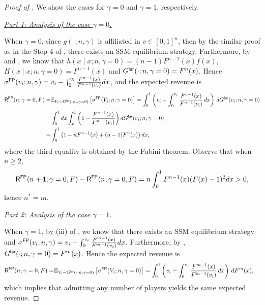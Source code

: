 \begin{proof}[Proof of ] We show the cases for $\gamma = 0$ and $\gamma = 1$, respectively.

\medskip

\noindent\textit{\underline{Part 1: Analysis of the case $\gamma = 0$.}} 

\medskip

\noindent When $ \gamma = 0$, since $g(\cdot;n,\gamma)$ is affiliated in $v\in [0,1]^n$, then by the similar proof as in the Step 4 of , there exists an SSM equilibrium strategy. Furthermore, by  and , we know that $h(x\mid x;n,\gamma=0) = (n-1)F^{n-2}(x)f(x)$, $H(x\mid x;n,\gamma=0) = F^{n-1}(x)$ and $G^{\mathsf{lar}}(\cdot; n,\gamma=0) = F^n(x)$. Hence $\sigma^{\mathsf{FP}}(v_i;n,\gamma) = v_i - \int_0^{v_i} \frac{F^{n-1}(x)}{F^{n-1}(v_i)}  dx$, and the expected revenue is
\begin{align*}
 \mathsf{R}^{\mathsf{FP}}(n;\gamma=0,F)=& \mathbb{E}_{V_i\sim G^{\mathsf{lar}}(\cdot; n,\gamma=0)}\left[\sigma^{\mathsf{FP}}(V_i;n,\gamma=0)\right]
 =\int_0^1 \left(v_i - \int_0^{v_i} \frac{F^{n-1}(x)}{F^{n-1}(v_i)}\, dx\right)\, dG^{\mathsf{lar}}(v_i;n,\gamma = 0)\\[1mm]
 =& \int_0^1 dx \int_x^1 \left(1-  \frac{F^{n-1}(x)}{F^{n-1}(v_i)}\right)dG^{\mathsf{lar}}(v_i;n,\gamma = 0)\\
 =&\int_0^1 \left(1-nF^{n-1}(x) + (n-1)F^n(x)\right)dx,
\end{align*}
where the third equality is obtained by the Fubini theorem. Observe that when $n\geq 2$,
\begin{align*}
    \mathsf{R}^{\mathsf{FP}}(n+1;\gamma=0,F) - \mathsf{R}^{\mathsf{FP}}(n;\gamma=0,F) = n\int_0^1 F^{n-1}(x)(F(x) - 1)^2dx > 0, 
\end{align*}
hence $n^* = m$.

\medskip

\noindent\textit{\underline{Part 2: Analysis of the case $\gamma = 1$.}} 

\medskip

\noindent When $ \gamma = 1$, by (iii) of , we know that there exists an SSM equilibrium strategy and $\sigma^{\mathsf{FP}}(v_i;n,\gamma) = v_i - \int_0^{v_i} \frac{F^{m-1}(x)}{F^{m-1}(v_i)}  dx$. 
Furthermore, by  ,  $G^{\mathsf{lar}}(\cdot; n,\gamma=0) = F^m(x)$. Hence the expected revenue is
\begin{align*}
 \mathsf{R}^{\mathsf{FP}}(n;\gamma=0,F)=& \mathbb{E}_{V_i\sim G^{\mathsf{lar}}(\cdot; n,\gamma=0)}\left[\sigma^{\mathsf{FP}}(V_i;n,\gamma=0)\right]
 =\int_0^1 \left(v_i - \int_0^{v_i} \frac{F^{m-1}(x)}{F^{m-1}(v_i)}\, dx\right)\, dF^{m}(x),
\end{align*}
which implies that admitting any number of players
yields the same expected revenue.
\end{proof}

